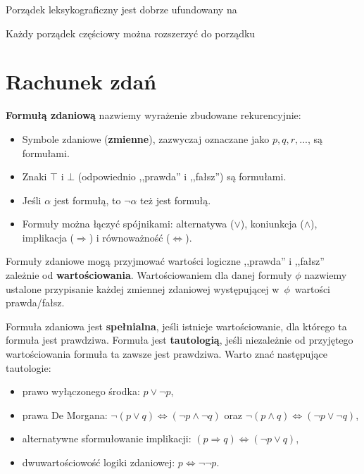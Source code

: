 \begin{problems}
    \prob Porządek leksykograficzny jest dobrze ufundowany na

    \prob Każdy porządek częściowy można rozszerzyć do porządku
\end{problems}






\section{Rachunek zdań}

\textbf{Formułą zdaniową} nazwiemy wyrażenie zbudowane rekurencyjnie:
\begin{itemize}
\item Symbole zdaniowe (\textbf{zmienne}), zazwyczaj oznaczane jako $p, q, r, ...$, są formułami.
\item Znaki $\top$ i $\bot$ (odpowiednio ,,prawda'' i ,,fałsz'') są formułami.
\item Jeśli $\alpha$ jest formułą, to $\neg\alpha$ też jest formułą.
\item Formuły można łączyć spójnikami: alternatywa ($\lor$), koniunkcja ($\land$), implikacja ($\Rightarrow$) i równoważność ($\Leftrightarrow$).
\end{itemize}

Formuły zdaniowe mogą przyjmować wartości logiczne ,,prawda'' i ,,fałsz'' zależnie od \textbf{wartościowania}. Wartościowaniem dla danej formuły $\phi$ nazwiemy ustalone przypisanie każdej zmiennej zdaniowej występującej w~$\phi$~wartości prawda/fałsz. 

Formuła zdaniowa jest \textbf{spełnialna}, jeśli istnieje wartościowanie, dla którego ta formuła jest prawdziwa. Formuła jest \textbf{tautologią}, jeśli niezależnie od przyjętego wartościowania formuła ta zawsze jest prawdziwa. Warto znać następujące tautologie:
\begin{itemize}
\item prawo wyłączonego środka: $p \lor \neg p$,
\item prawa De Morgana: $\neg(p \lor q) \Leftrightarrow (\neg p \land \neg q)$ oraz $\neg(p \land q) \Leftrightarrow (\neg p \lor \neg q)$,
\item alternatywne sformułowanie implikacji: $(p \Rightarrow q) \Leftrightarrow (\neg p \lor q)$,
\item dwuwartościowość logiki zdaniowej: $p \Leftrightarrow \neg\neg p$.
\end{itemize}

